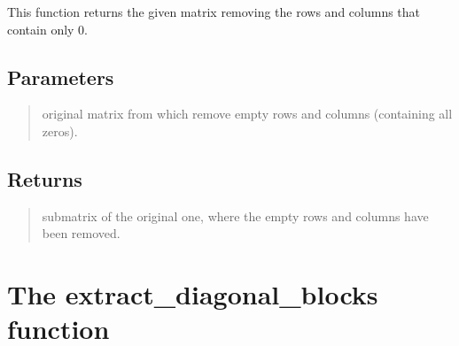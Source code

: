 \documentclass[letterpaper,10pt,english]{sphinxmanual}
\begin{document}
\begin{fulllineitems}
\label{\detokenize{index:hicanalysis.preprocessing.remove_empty_axis}}
\pysigstartsignatures
{}
\pysigstopsignatures
\sphinxAtStartPar
This function returns the given matrix removing the rows and columns that contain only 0.


\subsection{Parameters}
\label{\detokenize{index:id1}}\begin{quote}
\begin{description}
\sphinxAtStartPar
original matrix from which remove empty rows and columns (containing all zeros).

\end{description}
\end{quote}


\subsection{Returns}
\label{\detokenize{index:id2}}\begin{quote}
\begin{description}
\sphinxAtStartPar
submatrix of the original one, where the empty rows and columns have been removed.

\end{description}
\end{quote}

\end{fulllineitems}



\section{The extract\_diagonal\_blocks function}
\label{\detokenize{index:the-extract-diagonal-blocks-function}}
\end{document}
